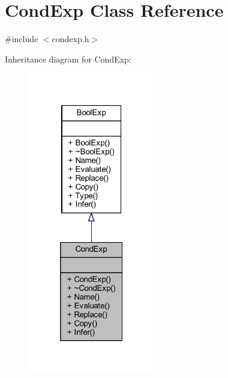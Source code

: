 \hypertarget{classCondExp}{}\section{Cond\+Exp Class Reference}
\label{classCondExp}


{\ttfamily \#include $<$condexp.\+h$>$}



Inheritance diagram for Cond\+Exp\+:
\nopagebreak
\begin{figure}[H]
\begin{center}
\leavevmode
\includegraphics[width=157pt]{classCondExp__inherit__graph}
\end{center}
\end{figure}


